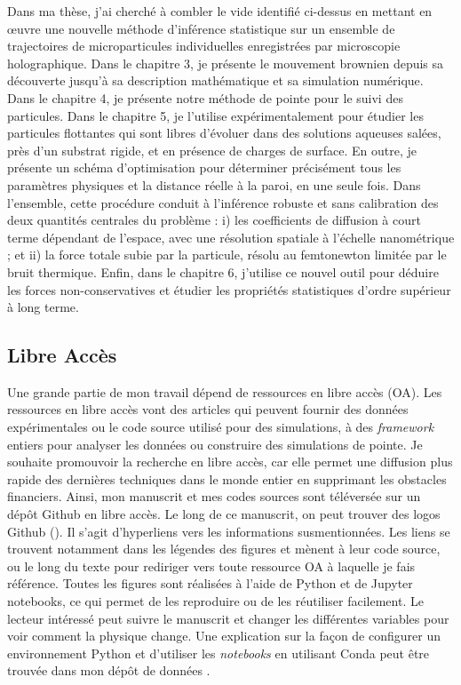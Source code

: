 Dans ma thèse, j'ai cherché à combler le vide identifié ci-dessus en mettant en œuvre une nouvelle méthode d'inférence statistique sur un ensemble de trajectoires de microparticules individuelles enregistrées par microscopie holographique. Dans le chapitre 3, je présente le mouvement brownien depuis sa découverte jusqu'à sa description mathématique et sa simulation numérique. Dans le chapitre 4, je présente notre méthode de pointe pour le suivi des particules. Dans le chapitre 5, je l'utilise expérimentalement pour étudier les particules flottantes qui sont libres d'évoluer dans des solutions aqueuses salées, près d'un substrat rigide, et en présence de charges de surface. En outre, je présente un schéma d'optimisation pour déterminer précisément tous les paramètres physiques et la distance réelle à la paroi, en une seule fois. Dans l'ensemble, cette procédure conduit à l'inférence robuste et sans calibration des deux quantités centrales du problème : i) les coefficients de diffusion à court terme dépendant de l'espace, avec une résolution spatiale à l'échelle nanométrique ; et ii) la force totale subie par la particule, résolu au femtonewton limitée par le bruit thermique. Enfin, dans le chapitre 6, j'utilise ce nouvel outil pour déduire les forces non-conservatives et étudier les propriétés statistiques d'ordre supérieur à long terme.




\subsection*{Libre Accès}

Une grande partie de mon travail dépend de ressources en libre accès (OA). Les ressources en libre accès vont des articles qui peuvent fournir des données expérimentales ou le code source utilisé pour des simulations, à des \textit{framework} entiers pour analyser les données ou construire des simulations de pointe. Je souhaite promouvoir la recherche en libre accès, car elle permet une diffusion plus rapide des dernières techniques dans le monde entier en supprimant les obstacles financiers. Ainsi, mon manuscrit et mes codes sources sont téléversée sur un dépôt Github en libre accès. Le long de ce manuscrit, on peut trouver des logos Github (\href{https://github.com/eXpensia/Ma-these/}{\faGithub}). Il s'agit d'hyperliens vers les informations susmentionnées. Les liens se trouvent notamment dans les légendes des figures et mènent à leur code source, ou le long du texte pour rediriger vers toute ressource OA à laquelle je fais référence. Toutes les figures sont réalisées à l'aide de Python et de Jupyter notebooks, ce qui permet de les reproduire ou de les réutiliser facilement. Le lecteur intéressé peut suivre le manuscrit et changer les différentes variables pour voir comment la physique change.  Une explication sur la façon de configurer un environnement Python et d'utiliser les \textit{notebooks} en utilisant Conda peut être trouvée dans mon dépôt de données \href{https://github.com/eXpensia/Ma-these/}{\faGithub}.



